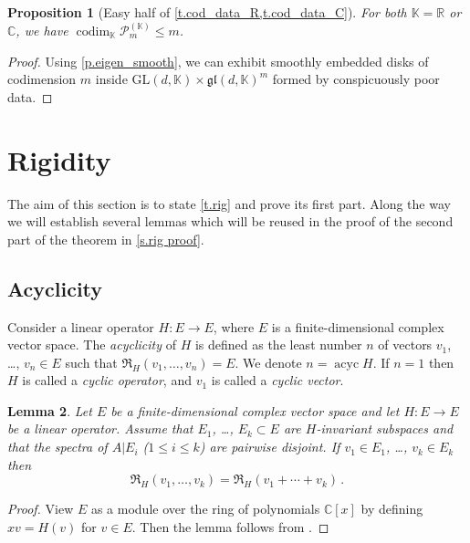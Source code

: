 \documentclass[10pt, a4paper]{amsart}
\theoremstyle{plain}
\newtheorem{lemma}{Lemma}[section]
\newtheorem{prop}[lemma]{Proposition}
\theoremstyle{definition}
\theoremstyle{remark}
\theoremstyle{note}
\numberwithin{equation}{section}
\begin{document}
\begin{prop}[Easy half of \cref{t.cod_data_R,t.cod_data_C}]\label{p.cod_data_easy_half}
For both ${\mathbb{K}} ={\mathbb{R}}$ or ${\mathbb{C}}$, we have 
$\operatorname{codim}_{\mathbb{K}} {\mathcal{P}}^{({\mathbb{K}})}_m \le m$.
\end{prop}

\begin{proof}
Using \cref{p.eigen_smooth},
we can exhibit smoothly embedded disks of codimension $m$ 
inside ${\mathrm{GL}}(d,{\mathbb{K}}) \times {\mathfrak{gl}}(d,{\mathbb{K}})^m$
formed by conspicuously poor data.
\end{proof}

\section{Rigidity}\label{s.rig}

The aim of this section is to state \cref{t.rig} and prove its first part.
Along the way we will establish several lemmas which will be reused 
in the proof of the second part of the theorem in \cref{s.rig proof}.

\subsection{Acyclicity}\label{ss.acyclicity}

Consider a linear operator $H \colon  E \to E$, 
where $E$ is a finite-dimensional complex vector space.
The \emph{acyclicity} of $H$ is defined as the least number 
$n$ of vectors $v_1$, \dots, $v_n \in E$
such that ${\mathfrak{R}}_H(v_1, \ldots, v_n) = E$.
We denote $n = \operatorname{acyc} H$.
If $n = 1$ then $H$ is called a \emph{cyclic operator},
and $v_1$ is called a \emph{cyclic vector}.

\begin{lemma}\label{l.sum}
Let $E$ be a finite-dimensional complex vector space and let 
$H \colon E \to E$ be a linear operator.
Assume that $E_1$, \ldots, $E_k \subset E$ are $H$-invariant subspaces
and that the spectra of $A|E_i$ ($1 \le i \le k$) are pairwise disjoint.
If $v_1 \in E_1$, \ldots, $v_k \in E_k$ then  
$$
{\mathfrak{R}}_H(v_1, \ldots, v_k) = {\mathfrak{R}}_H(v_1 + \cdots + v_k) \, .
$$
\end{lemma}

\begin{proof}
View $E$ as a module over the ring of polynomials ${\mathbb{C}}[x]$ by defining $xv=H(v)$ for $v \in E$.
Then the lemma follows from \cite[Theorem~6.4]{Roman}.
\end{proof}
\end{document}
